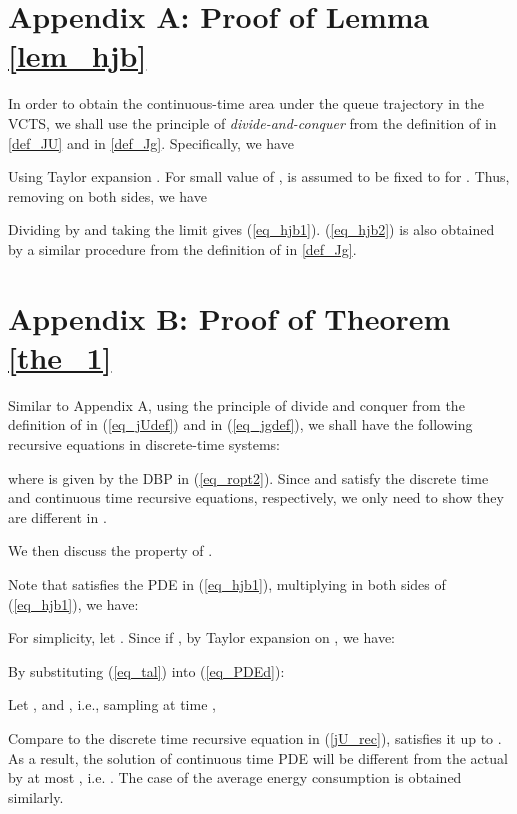 \documentclass[11pt,journal, onecolumn]{./IEEEtran}
\newcommand{\red}{\color{black}}
\begin{document}
\appendices


\section*{Appendix A: Proof of Lemma \ref{lem_hjb}}\label{app_hjb}
{\red In order to obtain the continuous-time area under the queue trajectory in the VCTS, we shall use the principle of {\em divide-and-conquer} from the definition of  in \eqref{def_JU} and  in \eqref{def_Jg}. Specifically, we have}


Using Taylor expansion . For small value of ,  is assumed to be fixed to  for . Thus, removing  on both sides, we have


Dividing by  and taking the limit  gives (\ref{eq_hjb1}). (\ref{eq_hjb2}) is also obtained by a similar procedure from the definition of  in \eqref{def_Jg}.


\section*{Appendix B: Proof of Theorem \ref{the_1}}\label{app_the_1}
{\red Similar to Appendix A, using the principle of divide and conquer from the definition of  in (\ref{eq_jUdef}) and  in (\ref{eq_jgdef}), we shall have the following recursive equations in discrete-time systems:


where  is given by the DBP in (\ref{eq_ropt2}). Since  and  satisfy the discrete time and continuous time recursive equations, respectively, we only need to show they are different in .

We then discuss the property of .} Note that  satisfies the PDE in (\ref{eq_hjb1}), multiplying  in both sides of (\ref{eq_hjb1}), we have:


For simplicity, let . Since  if , by Taylor expansion on , we have:


By substituting (\ref{eq_tal}) into (\ref{eq_PDEd}):


{\red Let ,  and , {\red i.e., sampling at time },


{\red Compare to the discrete time recursive equation in (\ref{jU_rec}),}  satisfies it up to . As a result, the solution of continuous time PDE  will be different from the actual  by at most , i.e. . The case of the average energy consumption is obtained similarly. }
\end{document}
